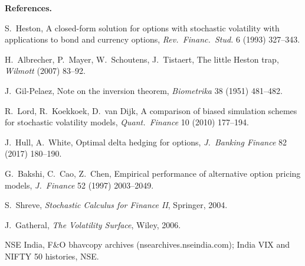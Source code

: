 \documentclass[10pt,leqno]{amsart}
\newcommand{\heading}[1]{\medskip\noindent\textbf{#1}\par}
\begin{document}
\heading{References.}
\begin{compactenum}[\small 1.]
\item {\small S.\ Heston, A closed-form solution for options with stochastic volatility with applications to bond and currency options, \emph{Rev.\ Financ.\ Stud.} 6 (1993) 327--343.}
\item {\small H.\ Albrecher, P.\ Mayer, W.\ Schoutens, J.\ Tistaert, The little Heston trap, \emph{Wilmott} (2007) 83--92.}
\item {\small J.\ Gil-Pelaez, Note on the inversion theorem, \emph{Biometrika} 38 (1951) 481--482.}
\item {\small R.\ Lord, R.\ Koekkoek, D.\ van Dijk, A comparison of biased simulation schemes for stochastic volatility models, \emph{Quant.\ Finance} 10 (2010) 177--194.}
\item {\small J.\ Hull, A.\ White, Optimal delta hedging for options, \emph{J.\ Banking Finance} 82 (2017) 180--190.}
\item {\small G.\ Bakshi, C.\ Cao, Z.\ Chen, Empirical performance of alternative option pricing models, \emph{J.\ Finance} 52 (1997) 2003--2049.}
\item {\small S.\ Shreve, \emph{Stochastic Calculus for Finance II}, Springer, 2004.}
\item {\small J.\ Gatheral, \emph{The Volatility Surface}, Wiley, 2006.}
\item {\small NSE India, F\&O bhavcopy archives (nsearchives.nseindia.com); India VIX and NIFTY 50 histories, NSE.}
\end{compactenum}

\bigskip
\ifdefined\PublicBuild

\else
{}
\fi
\end{document}

